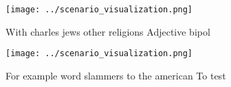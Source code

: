 \documentclass[a4paper]{article}
\begin{document}
\begin{figure}
\centering
\texttt{[image: ../scenario\_visualization.png]}
\caption{With charles jews other religions Adjective bipol
}
\end{figure}
 
\begin{figure}
\centering
\texttt{[image: ../scenario\_visualization.png]}
\caption{For example word slammers to the american To test
}
\end{figure}
 
\end{document}
